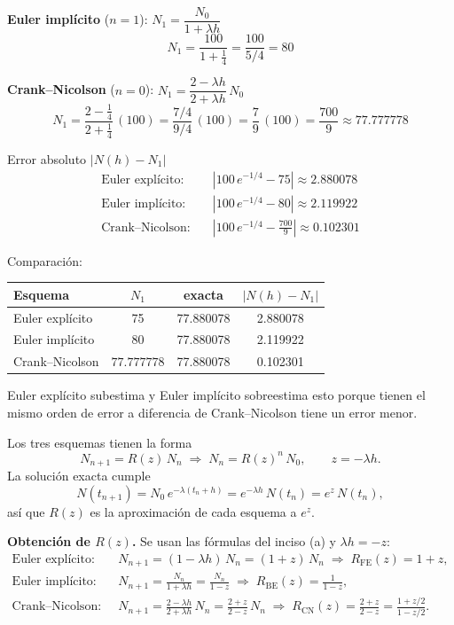 \textbf{Euler implícito} ($n = 1$): $N_1 = \dfrac{N_0}{1 + \lambda h}$
\[
N_1 = \frac{100}{1 + \frac14} = \frac{100}{5/4} = 80
\]

\textbf{Crank--Nicolson} ($n = 0$): $N_1 = \dfrac{2 - \lambda h}{2 + \lambda h}\,N_0$
\[
N_1 = \frac{2 - \frac14}{2 + \frac14}\,(100) = \frac{7/4}{9/4}\,(100) = \frac{7}{9}\,(100) = \frac{700}{9} \approx 77.777778
\]

Error absoluto $|N(h) - N_1|$
\begin{align*}
	\text{Euler explícito:}\quad & |100\,e^{-1/4} - 75| \approx 2.880078\\
	\text{Euler implícito:}\quad & |100\,e^{-1/4} - 80| \approx 2.119922\\
	\text{Crank--Nicolson:}\quad & \left|100\,e^{-1/4} - \tfrac{700}{9}\right| \approx 0.102301
\end{align*}

Comparación:
\begin{center}
	\begin{tabular}{lccc}\toprule
		Esquema & $N_1$ & exacta & $|N(h) - N_1|$\\\midrule
		Euler explícito & 75 & 77.880078 & 2.880078\\
		Euler implícito & 80 & 77.880078 & 2.119922\\
		Crank--Nicolson & $77.777778$ & 77.880078 & 0.102301\\\bottomrule
	\end{tabular}
\end{center}

Euler explícito subestima y Euler implícito sobreestima esto porque tienen el mismo orden de error a diferencia de Crank--Nicolson tiene un error menor.


Los tres esquemas tienen la forma
\[
N_{n+1} = R(z)\,N_n \;\Longrightarrow\; N_n = R(z)^n\,N_0, \qquad z = -\lambda h .
\]
La solución exacta cumple
\[
N(t_{n+1}) = N_0\,e^{-\lambda (t_n + h)} = e^{-\lambda h}\,N(t_n) = e^{z}\,N(t_n),
\]
así que $R(z)$ es la aproximación de cada esquema a $e^{z}$.

\textbf{Obtención de $R(z)$.} Se usan las fórmulas del inciso (a) y $\lambda h = -z$:
\begin{align*}
	\text{Euler explícito:}\quad & N_{n+1} = (1 - \lambda h)\,N_n = (1 + z)\,N_n \;\Longrightarrow\; R_{\mathrm{FE}}(z) = 1 + z,\\
	\text{Euler implícito:}\quad & N_{n+1} = \frac{N_n}{1 + \lambda h} = \frac{N_n}{1 - z} \;\Longrightarrow\; R_{\mathrm{BE}}(z) = \frac{1}{1 - z},\\
	\text{Crank--Nicolson:}\quad & N_{n+1} = \frac{2 - \lambda h}{2 + \lambda h}\,N_n = \frac{2 + z}{2 - z}\,N_n \;\Longrightarrow\; R_{\mathrm{CN}}(z) = \frac{2 + z}{2 - z} = \frac{1 + z/2}{1 - z/2} .
\end{align*}

